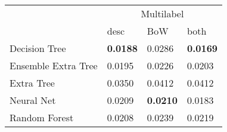 \begin{tabular}{|l|l|l|l| }
\hline
 &  \multicolumn{3}{c|}{Multilabel} \\
\cline{2-4} & desc & BoW & both \\ \hline
Decision Tree       & {\bf 0.0188} & 0.0286 & {\bf 0.0169}\\
Ensemble Extra Tree & 0.0195 & 0.0226 & 0.0203\\
Extra Tree          & 0.0350 & 0.0412 & 0.0412\\
Neural Net          & 0.0209 & {\bf 0.0210} & 0.0183\\
Random Forest       & 0.0208 & 0.0239 & 0.0219\\
\hline
\end{tabular}